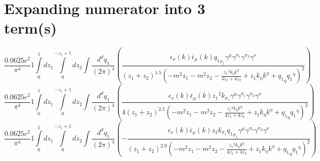 \section*{Expanding numerator into 3 term(s)}
\begin{dmath}\frac{0.0625 e^{2}}{\pi^{4}}1\int\limits_{ 0 }^{ 1 } d{ z_{ 1 } }\int\limits_{ 0 }^{ - { z_{ 1 } } + 1 } d{ z_{ 2 } }\int\frac{d^d q_1 }{ (2\pi)^4 }\left(\frac{\epsilon_{ \nu }({ k }) \bar{\epsilon}_{ \mu }({ k }) { { q_1 }_{ \sigma_1 } } { \gamma^{ \mu } } { \gamma^{ \sigma_1 } } { \gamma^{ \sigma_2 } } { \gamma^{ \nu } }}{\left({ z_{ 1 } } + { z_{ 2 } }\right)^{1.5} \left(- m^{2} { z_{ 1 } } - m^{2} { z_{ 2 } } - \frac{{ z_{ 1 } }^{2} { { k }_{ \eta } } { { k }^{ \eta } }}{4 { z_{ 1 } } + 4 { z_{ 2 } }} + { z_{ 1 } } { { k }_{ \eta } } { { k }^{ \eta } } + { { q_1 }_{ \eta } } { { q_1 }^{ \eta } }\right)^{2}}\right)\end{dmath}
\begin{dmath}\frac{0.0625 e^{2}}{\pi^{4}}1\int\limits_{ 0 }^{ 1 } d{ z_{ 1 } }\int\limits_{ 0 }^{ - { z_{ 1 } } + 1 } d{ z_{ 2 } }\int\frac{d^d q_1 }{ (2\pi)^4 }\left(\frac{\epsilon_{ \nu }({ k }) \bar{\epsilon}_{ \mu }({ k }) { z_{ 1 } }^{2} { { k }_{ \sigma_1 } } { \gamma^{ \mu } } { \gamma^{ \sigma_1 } } { \gamma^{ \sigma_2 } } { \gamma^{ \nu } }}{4 \left({ z_{ 1 } } + { z_{ 2 } }\right)^{2.5} \left(- m^{2} { z_{ 1 } } - m^{2} { z_{ 2 } } - \frac{{ z_{ 1 } }^{2} { { k }_{ \eta } } { { k }^{ \eta } }}{4 { z_{ 1 } } + 4 { z_{ 2 } }} + { z_{ 1 } } { { k }_{ \eta } } { { k }^{ \eta } } + { { q_1 }_{ \eta } } { { q_1 }^{ \eta } }\right)^{2}}\right)\end{dmath}
\begin{dmath}\frac{0.0625 e^{2}}{\pi^{4}}1\int\limits_{ 0 }^{ 1 } d{ z_{ 1 } }\int\limits_{ 0 }^{ - { z_{ 1 } } + 1 } d{ z_{ 2 } }\int\frac{d^d q_1 }{ (2\pi)^4 }\left(- \frac{\epsilon_{ \nu }({ k }) \bar{\epsilon}_{ \mu }({ k }) { z_{ 1 } } { { k }_{ \sigma_1 } } { { q_1 }_{ \sigma_1 } } { \gamma^{ \mu } } { \gamma^{ \sigma_1 } } { \gamma^{ \sigma_2 } } { \gamma^{ \nu } }}{\left({ z_{ 1 } } + { z_{ 2 } }\right)^{2.0} \left(- m^{2} { z_{ 1 } } - m^{2} { z_{ 2 } } - \frac{{ z_{ 1 } }^{2} { { k }_{ \eta } } { { k }^{ \eta } }}{4 { z_{ 1 } } + 4 { z_{ 2 } }} + { z_{ 1 } } { { k }_{ \eta } } { { k }^{ \eta } } + { { q_1 }_{ \eta } } { { q_1 }^{ \eta } }\right)^{2}}\right)\end{dmath}
